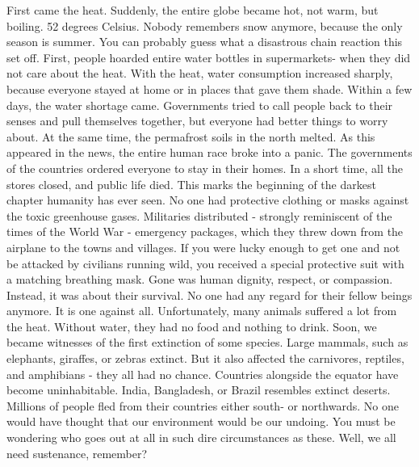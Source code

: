 \documentclass[]{book}
\begin{document}
First came the heat. Suddenly, the entire globe became hot, not warm, but boiling. 52 degrees Celsius. Nobody remembers snow anymore, because the only season is summer. You can probably guess what a disastrous chain reaction this set off. First, people hoarded entire water bottles in supermarkets- when they did not care about the heat. With the heat, water consumption increased sharply, because everyone stayed at home or in places that gave them shade. Within a few days, the water shortage came. Governments tried to call people back to their senses and pull themselves together, but everyone had better things to worry about. At the same time, the permafrost soils in the north melted. As this appeared in the news, the entire human race broke into a panic. The governments of the countries ordered everyone to stay in their homes. In a short time, all the stores closed, and public life died. This marks the beginning of the darkest chapter humanity has ever seen. No one had protective clothing or masks against the toxic greenhouse gases. Militaries distributed - strongly reminiscent of the times of the World War - emergency packages, which they threw down from the airplane to the towns and villages. If you were lucky enough to get one and not be attacked by civilians running wild, you received a special protective suit with a matching breathing mask. Gone was human dignity, respect, or compassion. Instead, it was about their survival. No one had any regard for their fellow beings anymore. It is one against all. Unfortunately, many animals suffered a lot from the heat. Without water, they had no food and nothing to drink. Soon, we became witnesses of the first extinction of some species. Large mammals, such as elephants, giraffes, or zebras extinct. But it also affected the carnivores, reptiles, and amphibians - they all had no chance. Countries alongside the equator have become uninhabitable. India, Bangladesh, or Brazil resembles extinct deserts. Millions of people fled from their countries either south- or northwards. No one would have thought that our environment would be our undoing. You must be wondering who goes out at all in such dire circumstances as these. Well, we all need sustenance, remember?
\end{document}
